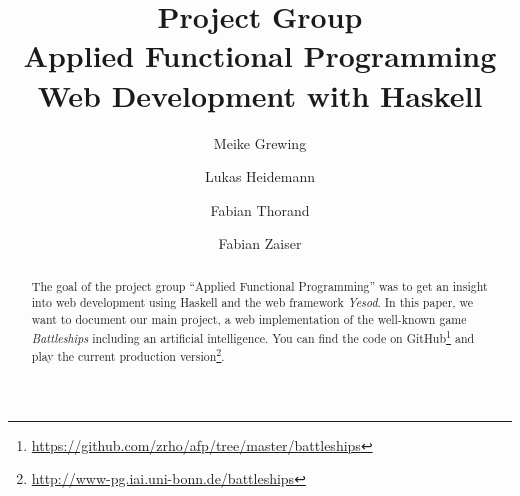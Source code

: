 \documentclass[a4paper]{easychair}
\begin{document}
%
\title{Project Group\\ Applied Functional Programming\\
       \large{Web Development with Haskell}}



%
\author{
  Meike Grewing
\and
  Lukas Heidemann
\and
  Fabian Thorand
\and 
  Fabian Zaiser\\
}




\clearpage

\maketitle

\begin{abstract}
The goal of the project group ``Applied Functional Programming'' was to get an insight into web development using Haskell and the web framework \emph{Yesod}. 
In this paper, we want to document our main project, a web implementation of the well-known game \emph{Battleships} including an artificial intelligence. You can find the code on GitHub\footnote{\url{https://github.com/zrho/afp/tree/master/battleships}} and play the current production version\footnote{\url{http://www-pg.iai.uni-bonn.de/battleships}}.
\end{abstract}

\setcounter{tocdepth}{2}

\pagestyle{empty}
\end{document}
